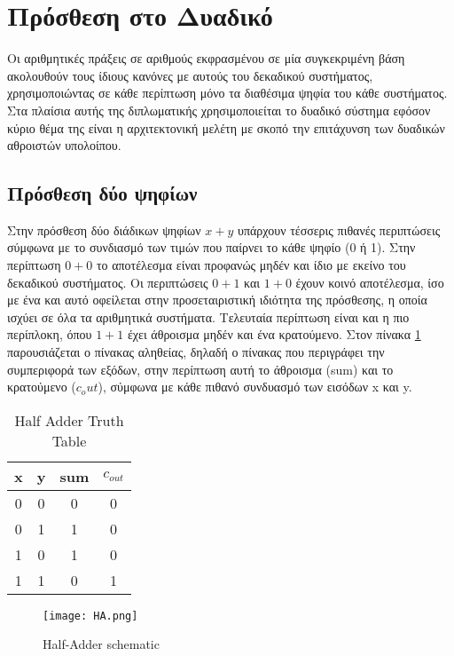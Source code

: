 

\section{Πρόσθεση στο Δυαδικό}
Οι αριθμητικές πράξεις σε αριθμούς εκφρασμένου σε μία συγκεκριμένη βάση ακολουθούν τους ίδιους κανόνες
με αυτούς του δεκαδικού συστήματος, χρησιμοποιώντας σε κάθε περίπτωση μόνο τα διαθέσιμα ψηφία του κάθε
συστήματος. Στα πλαίσια αυτής της διπλωματικής χρησιμοποιείται το δυαδικό σύστημα εφόσον κύριο θέμα 
της είναι η αρχιτεκτονική μελέτη με σκοπό την επιτάχυνση των δυαδικών αθροιστών υπολοίπου.





\subsection{Πρόσθεση δύο ψηφίων}
Στην πρόσθεση δύο διάδικων ψηφίων $x+y$ υπάρχουν τέσσερις πιθανές περιπτώσεις σύμφωνα με το συνδιασμό
των τιμών που παίρνει το κάθε ψηφίο (0 ή 1). Στην περίπτωση $0+0$ το αποτέλεσμα είναι προφανώς μηδέν 
και ίδιο με εκείνο του δεκαδικού συστήματος. Οι περιπτώσεις $0+1$ και $1+0$ έχουν κοινό αποτέλεσμα, 
ίσο με ένα και αυτό οφείλεται στην προσεταιριστική ιδιότητα της πρόσθεσης, η οποία ισχύει σε όλα
τα αριθμητικά συστήματα. Τελευταία περίπτωση είναι και η πιο περίπλοκη, όπου $1+1$ έχει άθροισμα μηδέν
και ένα κρατούμενο. Στον πίνακα \ref{tb:HA_truth_table} παρουσιάζεται ο πίνακας αληθείας, δηλαδή ο 
πίνακας που περιγράφει την συμπεριφορά των εξόδων, στην περίπτωση αυτή το άθροισμα (sum) και το 
κρατούμενο ($c_out$), σύμφωνα με κάθε πιθανό συνδυασμό των εισόδων x και y.


\begin{multicols}{2}
\begin{table}[H]
\centering
 \begin{tabular}{||c c | c c||} 
 \hline
 x & y & sum & $c_{out}$ \\ [0.5ex] 
 \hline\hline
 0 & 0 & 0 & 0 \\ 
 \hline
 0 & 1 & 1 & 0 \\
 \hline
 1 & 0 & 1 & 0 \\
 \hline
 1 & 1 & 0 & 1 \\
 \hline
\end{tabular}
\caption{Half Adder Truth Table}
 \label{tb:HA_truth_table}
\end{table}


\begin{figure}[H]
\centering
\texttt{[image: HA.png]}
\caption{Half-Adder schematic}
\label{HASchematic}
\end{figure}

\end{multicols}

